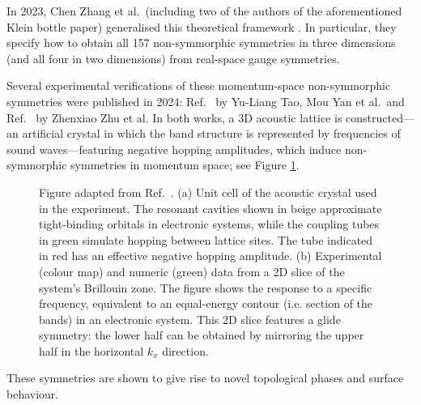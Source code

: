 In 2023, Chen Zhang et al.\ (including two of the authors of the aforementioned Klein bottle paper) generalised this theoretical framework \cite{Zhang_nonsymmorphic}. In particular, they specify how to obtain all 157 non-symmorphic symmetries in three dimensions (and all four in two dimensions) from real-space gauge symmetries.

Several experimental verifications of these momentum-space non-symmorphic symmetries were published in 2024: Ref.~\cite{TaoYan_acoustic-Klein} by Yu-Liang Tao, Mou Yan et al.\ and Ref.~\cite{Zhu_acoustic-Klein-halfturn} by Zhenxiao Zhu et al. In both works, a 3D acoustic lattice is constructed---an artificial crystal in which the band structure is represented by frequencies of sound waves---featuring negative hopping amplitudes, which induce non-symmorphic symmetries in momentum space; see Figure \ref{fig:acoustic-Klein}.
\begin{figure}[htb!]
	\centering
	\hfil
	\caption{Figure adapted	from Ref.~\cite{Zhu_acoustic-Klein-halfturn}. (a) Unit cell of the acoustic crystal used in the experiment. The resonant cavities shown in beige approximate tight-binding orbitals in electronic systems, while the coupling tubes in green simulate hopping between lattice sites. The tube indicated in red has an effective negative hopping amplitude. (b) Experimental (colour map) and numeric (green) data from a 2D slice of the system's Brillouin zone. The figure shows the response to a specific frequency, equivalent to an equal-energy contour (i.e. section of the bands) in an electronic system. This 2D slice features a glide symmetry: the lower half can be obtained by mirroring the upper half in the horizontal $k_x$ direction.} %
	\label{fig:acoustic-Klein}
\end{figure}
These symmetries are shown to give rise to novel topological phases and surface behaviour.


